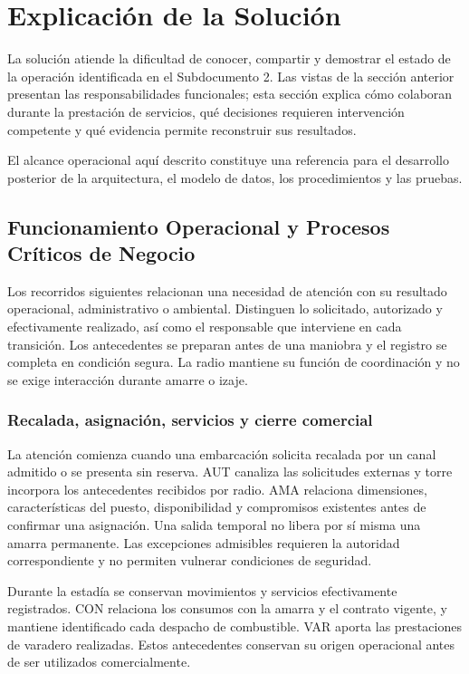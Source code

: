 \newpage
\section{Explicación de la Solución}

La solución atiende la dificultad de conocer, compartir
y demostrar el estado de la operación identificada en
el Subdocumento 2. Las vistas de la sección anterior
presentan las responsabilidades funcionales; esta sección
explica cómo colaboran durante la prestación de servicios,
qué decisiones requieren intervención competente y
qué evidencia permite reconstruir sus resultados.

El alcance operacional aquí descrito constituye una referencia para el desarrollo posterior de la arquitectura,
el modelo de datos, los procedimientos y las pruebas.

\subsection{Funcionamiento Operacional y Procesos Críticos de Negocio}

Los recorridos siguientes relacionan una necesidad
de atención con su resultado operacional, administrativo
o ambiental. Distinguen lo solicitado, autorizado y
efectivamente realizado, así como el responsable
que interviene en cada transición. Los antecedentes
se preparan antes de una maniobra y el registro se
completa en condición segura. La radio mantiene
su función de coordinación y no se exige interacción
durante amarre o izaje.

\subsubsection{Recalada, asignación, servicios y cierre comercial}

La atención comienza cuando una embarcación solicita
recalada por un canal admitido o se presenta sin reserva.
AUT canaliza las solicitudes externas y torre incorpora
los antecedentes recibidos por radio. AMA relaciona
dimensiones, características del puesto, disponibilidad
y compromisos existentes antes de confirmar una
asignación. Una salida temporal no libera por sí misma
una amarra permanente. Las excepciones admisibles
requieren la autoridad correspondiente y no permiten
vulnerar condiciones de seguridad.

Durante la estadía se conservan movimientos y servicios
efectivamente registrados. CON relaciona los consumos
con la amarra y el contrato vigente, y mantiene
identificado cada despacho de combustible. VAR aporta
las prestaciones de varadero realizadas. Estos
antecedentes conservan su origen operacional antes
de ser utilizados comercialmente.

